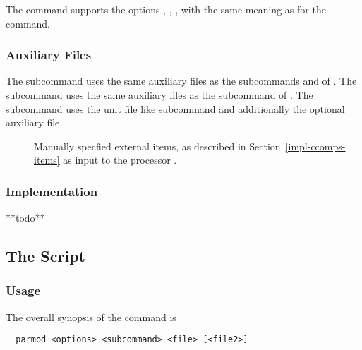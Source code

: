 The  command supports the options , , ,  with the same meaning as
for the  command.

\subsubsection{Auxiliary Files}

The subcommand  uses the same auxiliary files as the subcommands  and  of .
The subcommand  uses the same auxiliary files as the subcommand  of .
The subcommand  uses the unit file  like subcommand  and additionally
the optional auxiliary file 
\begin{description}
\item[] Manually specfied external items, as described in Section~\ref{impl-ccomps-items} as
input to the processor .
\end{description}

\subsubsection{Implementation}

**todo**



\subsection{The  Script}
\label{impl-all-parmod}

\subsubsection{Usage}

The overall synopsis of the  command is
\begin{verbatim}
  parmod <options> <subcommand> <file> [<file2>]
\end{verbatim}

